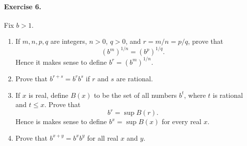 \documentclass[11pt]{report}
\theoremstyle{remark}
\begin{document}
    \paragraph{Exercise 6.} Fix $b > 1$.
    \begin{enumerate}
        \item If $m, n, p, q$ are integers, $n > 0$, $q > 0$, and $r = m / n = p /
        q$, prove that \[
            (b^m)^{1 / n} = (b^p)^{1 / q}.
        \] Hence it makes sense to define $b^r = (b^m)^{1 / n}$.
        \item Prove that $b^{r + s} = b^rb^s$ if $r$ and $s$ are rational.
        \item If $x$ is real, define $B(x)$ to be the set of all numbers $b^t$,
        where $t$ is rational and $t \leq x$. Prove that \[
            b^r = \sup B(r).
        \] Hence is makes sense to define $b^x = \sup B(x)$ for every real $x$.
        \item Prove that $b^{x + y} = b^xb^y$ for all real $x$ and $y$.
    \end{enumerate}
\end{document}
